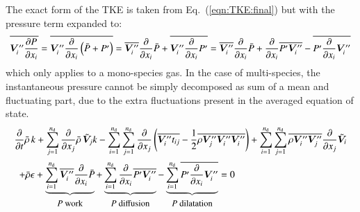 \documentclass{warpdoc}
\newcommand{\alb}{\vspace{0.2cm}\\} %
\newcommand{\nd}{{{n}_{\rm d}}}
\newcommand{\mfd}{\displaystyle}
\begin{document}
The exact form of the TKE is taken from Eq.\ (\ref{eqn:TKE:final})
but with the pressure term expanded to:
%
\begin{displaymath}
     \overline{\bm{V}_i^{{\prime\prime}} \frac{\partial P}{\partial x_i}}
   = \overline{\bm{V}_i^{{\prime\prime}} \frac{\partial }{\partial x_i} \left( \bar{P}+P^{\prime}\right) }
   = \overline{\bm{V}_i^{{\prime\prime}}} \frac{\partial }{\partial x_i} \bar{P}
       + \overline{\bm{V}_i^{{\prime\prime}} \frac{\partial }{\partial x_i} P^{\prime} }
   = \overline{\bm{V}_i^{{\prime\prime}}} \frac{\partial }{\partial x_i} \bar{P}
       + \frac{\partial }{\partial x_i} \overline{ P^{\prime} \bm{V}_i^{{\prime\prime}}}
       - \overline{P^{\prime} \frac{\partial }{\partial x_i} \bm{V}_i^{{\prime\prime}} }
\end{displaymath}
%
which only applies to a mono-species gas. In the case of multi-species,
the instantaneous pressure cannot be simply decomposed as sum of
a mean and fluctuating part, due to the extra fluctuations present
in the averaged equation of state.
%
\begin{equation}
  \begin{array}{l}
  \mfd
    \frac{\partial }{\partial t} \wbar{\rho}\, k
   +  \sum_{j=1}^{\nd}\frac{\partial }{\partial x_j} \wbar{\rho}\, {\wtilde{\bm{V}}_j} k
   - \mfd\sum_{i=1}^\nd\sum_{j=1}^{\nd} \frac{\partial }{\partial x_j} \left( \overline{\bm{V}_i^{{\prime\prime}} t_{ij}}
                     - {\frac{1}{2}} \overline{\rho {\bm{V}_j^{{\prime\prime}}} \bm{V}_i^{{\prime\prime}} \bm{V}_i^{{\prime\prime}}} \right)
   + \sum_{i=1}^\nd \mfd\sum_{j=1}^{\nd}
                              \overline{\rho \bm{V}_i^{{\prime\prime}} \bm{V}_j^{{\prime\prime}}}
                                     \frac{\partial }{\partial x_j} {\wtilde{\bm{V}}_i} \alb~~
   + \wbar{\rho} \epsilon 
   + \mfd\underbrace{\sum_{i=1}^\nd\overline{\bm{V}_i^{{\prime\prime}}} \frac{\partial }{\partial x_i} \wbar{P}}_{\begin{tabular}{c}\small $P$ {\rm work}\end{tabular}}
       + \underbrace{\sum_{i=1}^\nd\frac{\partial }{\partial x_i} \overline{ P^{\prime} \bm{V}_i^{{\prime\prime}}}}_{\begin{tabular}{c}\small $P$ {\rm diffusion}\end{tabular}}
       - \underbrace{\sum_{i=1}^\nd\overline{P^{\prime} \frac{\partial }{\partial x_i} \bm{V}_i^{{\prime\prime}} }}_{\begin{tabular}{c}\small $P$ {\rm dilatation}\end{tabular}}
   = 0
  \end{array}
  \label{eqn:TKE:modeled:1}
\end{equation}
\end{document}
